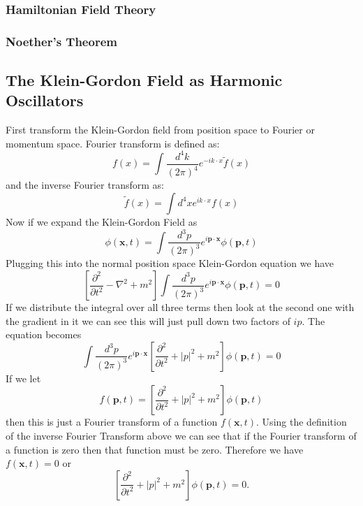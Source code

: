 \documentclass{article}
\numberwithin{equation}{section}
\begin{document}
\subsubsection{Hamiltonian Field Theory}

\subsubsection{Noether's Theorem}

\subsection{The Klein-Gordon Field as Harmonic Oscillators}

First transform the Klein-Gordon field from position space to Fourier or momentum space. Fourier transform is defined as:
\begin{equation}
    f(x) = \int \frac{d^4 k}{(2\pi)^4} e^{-ik \cdot x} \tilde{f}(x)
\end{equation}
and the inverse Fourier transform as:
\begin{equation}
    \tilde{f}(x) = \int d^4x e^{ik \cdot x} f(x)
\end{equation}
Now if we expand the Klein-Gordon Field as
\begin{equation}
    \phi(\mathbf{x},t) = \int \frac{d^3p}{(2\pi)^3} e^{i\mathbf{p} \cdot \mathbf{x}} \phi(\mathbf{p},t)
\end{equation}
Plugging this into the normal position space Klein-Gordon equation we have
\begin{equation}
    \left[ \frac{\partial^2}{\partial t^2} - \nabla ^2 + m^2 \right] 
    \int \frac{d^3p}{(2\pi)^3} e^{i\mathbf{p} \cdot \mathbf{x}} \phi(\mathbf{p},t) = 0
\end{equation}
If we distribute the integral over all three terms then look at the second one with the gradient in it we can see this will just pull down two factors of $ip$. The equation becomes
\begin{equation}
    \int \frac{d^3p}{(2\pi)^3} e^{i\mathbf{p} \cdot \mathbf{x}}  \left[ \frac{\partial^2}{\partial t^2} + |p|^2 + m^2 \right] \phi(\mathbf{p},t) = 0
\end{equation}
If we let 
\begin{equation}
    f(\mathbf{p},t) = \left[ \frac{\partial^2}{\partial t^2} + |p|^2 + m^2 \right] \phi(\mathbf{p},t)
\end{equation}
then this is just a Fourier transform of a function $f(\mathbf{x},t)$. Using the definition of the inverse Fourier Transform above we can see that if the Fourier transform of a function is zero then that function must be zero. Therefore we have $f(\mathbf{x},t) = 0$ or 
\begin{equation}
    \left[ \frac{\partial^2}{\partial t^2} + |p|^2 + m^2 \right] \phi(\mathbf{p},t) = 0.
\end{equation}
\end{document}
